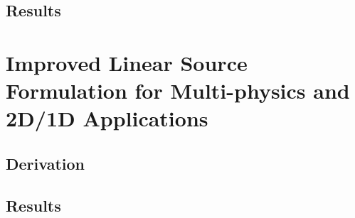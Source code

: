 {{    \subsection{Results}{\label{ssec:LSMOC:ET:Results}
      \blindtext[5]
    }
  }
  \section{Improved Linear Source Formulation for Multi-physics and 2D/1D Applications}{\label{sec:Improved Linear Source Formulation for Multi-physics and 2D/1D Applications}
    \blindtext
    \subsection{Derivation}{\label{ssec:LSMOC:Derivation}
      \blindtext[5]
    }
    \subsection{Results}{\label{ssec:LSMOC:Results}
      \blindtext[5]
    }
  }


  \printbibliography
}


